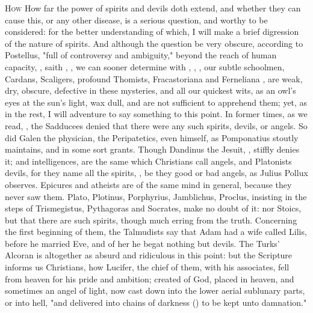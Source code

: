 \lettrine{H}{ow} How far the power of spirits and devils doth extend, and
whether they can cause this, or any other disease, is a serious question, and
worthy to be considered: for the better understanding of which, I will make a
brief digression of the nature of spirits. And although the question be very
obscure, according to Postellus, "full of controversy and
ambiguity," beyond the reach of human capacity, , saith
\Austin{}, , we
can sooner determine with \Tully{}, ,
, our subtle schoolmen, Cardans, Scaligers,
profound Thomists, Fracastoriana and Ferneliana , are weak, dry,
obscure, defective in these mysteries, and all our quickest wits, as an owl's
eyes at the sun's light, wax dull, and are not sufficient to apprehend them;
yet, as in the rest, I will adventure to say something to this point. In former
times, as we read, , the Sadducees denied that there
were any such spirits, devils, or angels. So did Galen the physician, the
Peripatetics, even \Aristotle{} himself, as Pomponatius stoutly maintains, and
\Scaliger{} in some sort grants. Though Dandinus the Jesuit,
, stiffly denies it;
 and intelligences, are the same which Christians
call angels, and Platonists devils, for they name all the spirits,
, be they good or bad angels, as Julius Pollux
 observes. Epicures and
atheists are of the same mind in general, because they never saw them. Plato,
Plotinus, Porphyrius, Jamblichus, Proclus, insisting in the steps of
Trismegistus, Pythagoras and Socrates, make no doubt of it: nor Stoics, but
that there are such spirits, though much erring from the truth. Concerning the
first beginning of them, the Talmudists say that Adam had
a wife called Lilis, before he married Eve, and of her he begat nothing but
devils. The Turks' Alcoran is altogether as absurd and
ridiculous in this point: but the Scripture informs us Christians, how Lucifer,
the chief of them, with his associates, fell from heaven
for his pride and ambition; created of God, placed in heaven, and sometimes an
angel of light, now cast down into the lower aerial sublunary parts, or into
hell, "and delivered into chains of darkness () to
be kept unto damnation."

